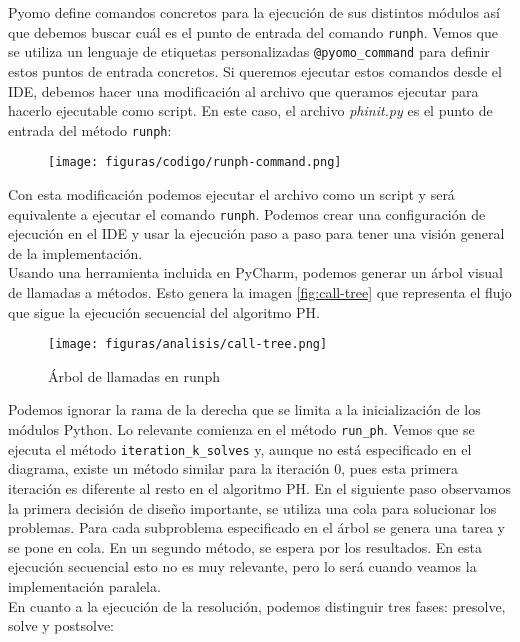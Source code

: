 Pyomo define comandos concretos para la ejecución de sus distintos módulos así que debemos buscar cuál es el punto de entrada del comando \texttt{runph}. Vemos que se utiliza un lenguaje de etiquetas personalizadas \texttt{@pyomo\_command} para definir estos puntos de entrada concretos. Si queremos ejecutar estos comandos desde el IDE, debemos hacer una modificación al archivo que queramos ejecutar para hacerlo ejecutable como script. En este caso, el archivo \textit{phinit.py} es el punto de entrada del método \texttt{runph}:

\begin{figure}[H]
    \centerline{\texttt{[image: figuras/codigo/runph-command.png]}}
\end{figure}

Con esta modificación podemos ejecutar el archivo como un script y será equivalente a ejecutar el comando \texttt{runph}. Podemos crear una configuración de ejecución en el IDE y usar la ejecución paso a paso para tener una visión general de la implementación. \\

Usando una herramienta incluida en PyCharm, podemos generar un árbol visual de llamadas a métodos. Esto genera la imagen \autoref{fig:call-tree} que representa el flujo que sigue la ejecución secuencial del algoritmo PH.

\begin{figure}[]
    \centerline{\texttt{[image: figuras/analisis/call-tree.png]}}
    \caption{Árbol de llamadas en runph}
    \label{fig:call-tree}
\end{figure}

Podemos ignorar la rama de la derecha que se limita a la inicialización de los módulos Python. Lo relevante comienza en el método \texttt{run\_ph}. Vemos que se ejecuta el método \texttt{iteration\_k\_solves} y, aunque no está especificado en el diagrama, existe un método similar para la iteración 0, pues esta primera iteración es diferente al resto en el algoritmo PH.
En el siguiente paso observamos la primera decisión de diseño importante, se utiliza una cola para solucionar los problemas. Para cada subproblema especificado en el árbol se genera una tarea y se pone en cola. En un segundo método, se espera por los resultados. En esta ejecución secuencial esto no es muy relevante, pero lo será cuando veamos la implementación paralela.\\

En cuanto a la ejecución de la resolución, podemos distinguir tres fases: presolve, solve y postsolve:

